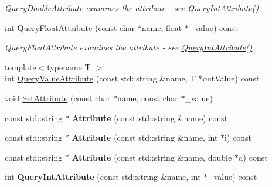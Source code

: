 \begin{DoxyCompactItemize}
\begin{DoxyCompactList}\small\item\em QueryDoubleAttribute examines the attribute -\/ see \hyperlink{class_ti_xml_element_aea0bfe471380f281c5945770ddbf52b9}{QueryIntAttribute()}. \item\end{DoxyCompactList}\item 
\hypertarget{class_ti_xml_element_aa04d3af11601ef5a5f88295203a843be}{
int \hyperlink{class_ti_xml_element_aa04d3af11601ef5a5f88295203a843be}{QueryFloatAttribute} (const char $\ast$name, float $\ast$\_\-value) const }
\label{class_ti_xml_element_aa04d3af11601ef5a5f88295203a843be}

\begin{DoxyCompactList}\small\item\em QueryFloatAttribute examines the attribute -\/ see \hyperlink{class_ti_xml_element_aea0bfe471380f281c5945770ddbf52b9}{QueryIntAttribute()}. \item\end{DoxyCompactList}\item 
{\footnotesize template$<$typename T $>$ }\\int \hyperlink{class_ti_xml_element_ae3b9a03b0a56663a40801c7256683576}{QueryValueAttribute} (const std::string \&name, T $\ast$outValue) const 
\item 
void \hyperlink{class_ti_xml_element_abf0b3bd7f0e4c746a89ec6e7f101fc32}{SetAttribute} (const char $\ast$name, const char $\ast$\_\-value)
\item 
\hypertarget{class_ti_xml_element_a0397ccf40f95e01bfcc46728170df135}{
const std::string $\ast$ {\bfseries Attribute} (const std::string \&name) const }
\label{class_ti_xml_element_a0397ccf40f95e01bfcc46728170df135}

\item 
\hypertarget{class_ti_xml_element_aa0be00b00ed249cbedc2723a5b888ef5}{
const std::string $\ast$ {\bfseries Attribute} (const std::string \&name, int $\ast$i) const }
\label{class_ti_xml_element_aa0be00b00ed249cbedc2723a5b888ef5}

\item 
\hypertarget{class_ti_xml_element_a22833b0b61d8c7f6b81e15a6da345a95}{
const std::string $\ast$ {\bfseries Attribute} (const std::string \&name, double $\ast$d) const }
\label{class_ti_xml_element_a22833b0b61d8c7f6b81e15a6da345a95}

\item 
\hypertarget{class_ti_xml_element_ad79cb2416a5b94784f9a517add7e2d6d}{
int {\bfseries QueryIntAttribute} (const std::string \&name, int $\ast$\_\-value) const }
\label{class_ti_xml_element_ad79cb2416a5b94784f9a517add7e2d6d}


\end{DoxyCompactItemize}
